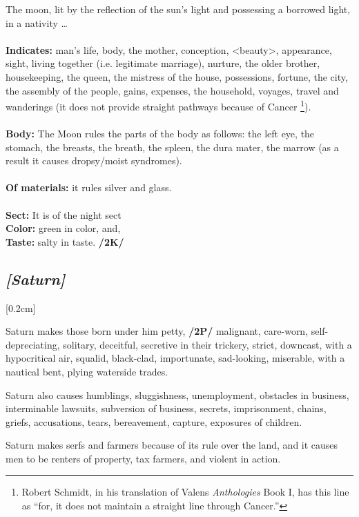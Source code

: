 The moon, lit by the reflection of the sun’s light and possessing a borrowed light, in a nativity \ldots \\
\\
\textbf{Indicates:} man’s life, body, the mother, conception, <beauty>, appearance, sight, living together (i.e. legitimate marriage), nurture, the older brother, housekeeping, the queen, the mistress of the house, possessions, fortune, the city, the assembly of the people, gains, expenses, the household, voyages, travel and wanderings (it does not provide straight pathways because of Cancer
\footnote{Robert Schmidt, in his translation of Valens \textit{Anthologies} Book I, has this line as ``for, it does not maintain a straight line through Cancer.''}). \\
\\
\textbf{Body:} The Moon rules the parts of the body as follows: the left eye, the stomach, the breasts, the breath, the spleen, the dura mater, the marrow (as a result it causes dropsy/moist syndromes). \\
\\
\textbf{Of materials:} it rules silver and glass. \\
\\
\textbf{Sect:} It is of the night sect \\
\textbf{Color:} green in color, and, \\
\textbf{Taste:} salty in taste. \textbf{/2K/}
\secbr
\subsection{\textit{[Saturn]}}
[0.2cm]

Saturn makes those born under him petty, \textbf{/2P/} malignant, care-worn, self-depreciating, solitary, deceitful, secretive in their trickery, strict, downcast, with a hypocritical air, squalid, black-clad, importunate, sad-looking, miserable, with a nautical bent, plying waterside trades. 

Saturn also causes humblings, sluggishness, unemployment, obstacles in business, interminable lawsuits, subversion of business, secrets, imprisonment, chains, griefs, accusations, tears, bereavement, capture, exposures of children. 

Saturn makes serfs and farmers because of its rule over the land, and it causes men to be renters of property, tax farmers, and violent in action. 


